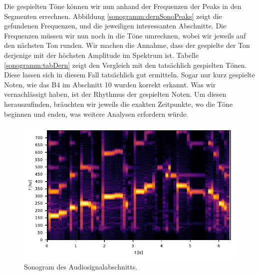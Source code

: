 Die gespielten Töne können wir nun anhand der Frequenzen 
der Peaks in den Segmenten errechnen.
Abbildung \ref{sonogramm:dernSonoPeaks} zeigt die gefundenen Frequenzen, und die
jeweiligen interessanten Abschnitte.
Die Frequenzen müssen wir nun noch in die Töne umrechnen, wobei wir jeweils auf den
nächsten Ton runden.
Wir machen die Annahme, dass der gespielte der Ton derjenige mit der höchsten Amplitude im Spektrum 
ist. 
Tabelle \ref{sonogramm:tabDern} zeigt den Vergleich mit den tatsächlich gespielten Tönen.
Diese lassen sich in diesem Fall tatsächlich gut ermitteln.
Sogar nur kurz gespielte Noten, wie das B4 im Abschnitt 10 
wurden korrekt erkannt.
Was wir vernachlässigt haben, ist der Rhythmus der gespielten Noten.
Um diesen herauszufinden, bräuchten wir jeweils die exakten Zeitpunkte, wo die Töne
beginnen und enden, was weitere Analysen erfordern würde.

\begin{figure}
    \centering
    \includegraphics{papers/sonogramm/images/dernSono1.pdf}
    \caption{Sonogram des Audiosignalabschnitts.
    \label{sonogramm:dernSono}
    }
\end{figure}

